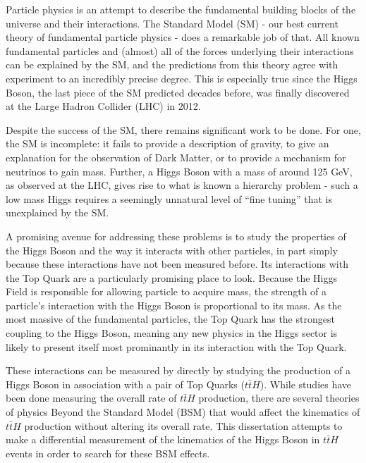 Particle physics is an attempt to describe the fundamental building blocks of the universe and their interactions. The Standard Model (SM) - our best current theory of fundamental particle physics - does a remarkable job of that. All known fundamental particles and (almost) all of the forces underlying their interactions can be explained by the SM, and the predictions from this theory agree with experiment to an incredibly precise degree. This is especially true since the Higgs Boson, the last piece of the SM predicted decades before, was finally discovered at the Large Hadron Collider (LHC) in 2012. 

Despite the success of the SM, there remains significant work to be done. For one, the SM is incomplete: it fails to provide a description of gravity, to give an explanation for the observation of Dark Matter, or to provide a mechanism for neutrinos to gain mass. Further, a Higgs Boson with a mass of around 125 GeV, as observed at the LHC, gives rise to what is known a hierarchy problem - such a low mass Higgs requires a seemingly unnatural level of ``fine tuning'' that is unexplained by the SM.

A promising avenue for addressing these problems is to study the properties of the Higgs Boson and the way it interacts with other particles, in part simply because these interactions have not been measured before. Its interactions with the Top Quark are a particularly promising place to look. Because the Higgs Field is responsible for allowing particle to acquire mass, the strength of a particle's interaction with the Higgs Boson is proportional to its mass. As the most massive of the fundamental particles, the Top Quark has the strongest coupling to the Higgs Boson, meaning any new physics in the Higgs sector is likely to present itself most prominantly in its interaction with the Top Quark.

These interactions can be measured by directly by studying the production of a Higgs Boson in association with a pair of Top Quarks ($t\bar{t}H$). While studies have been done measuring the overall rate of $t\bar{t}H$ production, there are several theories of physics Beyond the Standard Model (BSM) that would affect the kinematics of $t\bar{t}H$ production without altering its overall rate. This dissertation attempts to make a differential measurement of the kinematics of the Higgs Boson in $t\bar{t}H$ events in order to search for these BSM effects.


